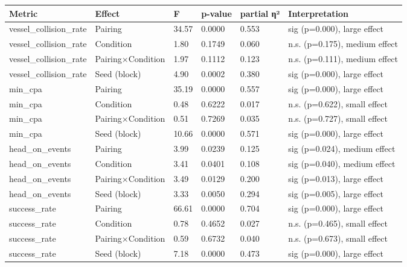\begin{tabular}{llllll}
\toprule
Metric & Effect & F & p-value & partial η² & Interpretation \\
\midrule
vessel\_collision\_rate & Pairing & 34.57 & 0.0000 & 0.553 & sig (p=0.000), large effect \\
vessel\_collision\_rate & Condition & 1.80 & 0.1749 & 0.060 & n.s. (p=0.175), medium effect \\
vessel\_collision\_rate & Pairing×Condition & 1.97 & 0.1112 & 0.123 & n.s. (p=0.111), medium effect \\
vessel\_collision\_rate & Seed (block) & 4.90 & 0.0002 & 0.380 & sig (p=0.000), large effect \\
min\_cpa & Pairing & 35.19 & 0.0000 & 0.557 & sig (p=0.000), large effect \\
min\_cpa & Condition & 0.48 & 0.6222 & 0.017 & n.s. (p=0.622), small effect \\
min\_cpa & Pairing×Condition & 0.51 & 0.7269 & 0.035 & n.s. (p=0.727), small effect \\
min\_cpa & Seed (block) & 10.66 & 0.0000 & 0.571 & sig (p=0.000), large effect \\
head\_on\_events & Pairing & 3.99 & 0.0239 & 0.125 & sig (p=0.024), medium effect \\
head\_on\_events & Condition & 3.41 & 0.0401 & 0.108 & sig (p=0.040), medium effect \\
head\_on\_events & Pairing×Condition & 3.49 & 0.0129 & 0.200 & sig (p=0.013), large effect \\
head\_on\_events & Seed (block) & 3.33 & 0.0050 & 0.294 & sig (p=0.005), large effect \\
success\_rate & Pairing & 66.61 & 0.0000 & 0.704 & sig (p=0.000), large effect \\
success\_rate & Condition & 0.78 & 0.4652 & 0.027 & n.s. (p=0.465), small effect \\
success\_rate & Pairing×Condition & 0.59 & 0.6732 & 0.040 & n.s. (p=0.673), small effect \\
success\_rate & Seed (block) & 7.18 & 0.0000 & 0.473 & sig (p=0.000), large effect \\
\bottomrule
\end{tabular}
